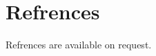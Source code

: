 \documentclass{modernsimplecv}
\newlength{\rightcolwidth}
\begin{document}
\begin{paracol}{2}
\begin{tabular}{>{\footnotesize\bfseries}r >{\footnotesize}p{}}
\end{tabular}

\section{Refrences}\label{sec:refrences}
Refrences are available on request.













\end{paracol}
\end{document}
